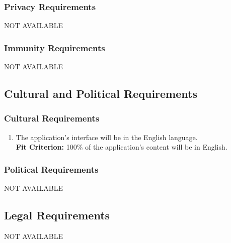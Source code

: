 \documentclass[12pt,letterpaper]{article}
\begin{document}
\subsubsection{Privacy Requirements}
NOT AVAILABLE
\subsubsection{Immunity Requirements}
NOT AVAILABLE
\subsection{Cultural and Political Requirements}
\subsubsection{Cultural Requirements}
\begin{enumerate}[{CU}1] 
    \item The application's interface will be in the English language. \\
    {\textbf{Fit Criterion:} 100\% of the application's content will be in English. }
\end{enumerate}
\subsubsection{Political Requirements}
NOT AVAILABLE
\subsection{Legal Requirements}
NOT AVAILABLE

\newpage
\end{document}
